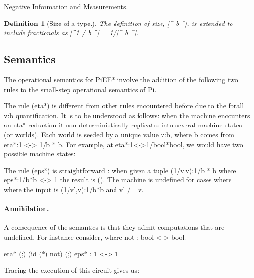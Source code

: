 \documentclass[preprint]{sigplanconf}
\newtheorem{definition}[theorem]{Definition}
\begin{document}
Negative Information and Measurements. 

\begin{definition}[Size of a type.] 
\label{def:size-frac}
The definition of size, {{[^ b ^]}}, is extended to include
fractionals as {{[^1 / b ^] = 1/[^ b ^]}}.
\end{definition}

\subsection{Semantics}

The operational semantics for {{PiEE*}} involve the addition of the
following two rules to the small-step operational semantics of {{Pi}}.


The rule {{(eta*)}} is different from other rules encountered before
due to the {{forall v:b}} quantification. It is to be understood as
follows: when the machine encounters an {{eta*}} reduction it
non-deterministically replicates into several machine states (or
worlds). Each world is seeded by a unique value {{v:b}}, where {{b}}
comes from {{eta*:1 <-> 1/b * b}}.  For example, at
{{eta*:1<->1/bool*bool}}, we would have two possible machine
states:




The rule {{(eps*)}} is straightforward : when given a tuple
{{(1/v,v):1/b * b}} where {{eps*:1/b*b <-> 1}} the result is
{{()}}. The machine is undefined for cases where where the input is
{{(1/v',v):1/b*b}} and {{v' /= v}}.

\paragraph*{Annihilation.} 
A consequence of the semantics is that they admit computations that
are undefined. For instance consider, where {{not : bool <-> bool}}. 

{{eta* (;) (id (*) not) (;) eps* : 1 <-> 1}}

\noindent
Tracing the execution of this circuit gives us: 

\end{document}
